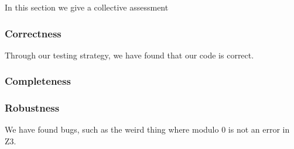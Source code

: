 In this section we give a collective assessment



\subsubsection{Correctness}
Through our testing strategy, we have found that our code is correct.


\subsubsection{Completeness}

\subsubsection{Robustness}

We have found bugs, such as the weird thing where modulo 0 is not an error in Z3.

